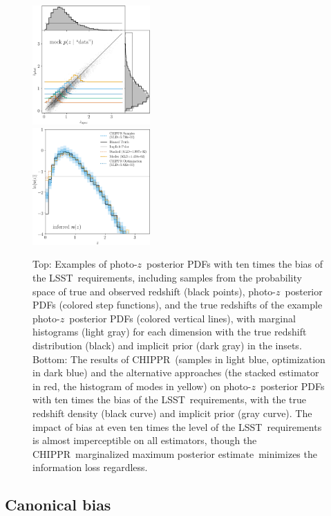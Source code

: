 \documentclass[iop]{emulateapj}
\newcommand{\project}[1]{\textsc{#1}}
\newcommand{\lsst}{\project{LSST}}
\newcommand{\Chippr}{\project{CHIPPR}}
\newcommand{\pz}{photo-$z$}
\newcommand{\pzpdf}{\pz\ posterior PDF}
\newcommand{\mmle}{marginalized maximum posterior estimate}
\begin{document}
\begin{figure}
	\begin{center}
		\includegraphics[width=0.4\textwidth]{data_bias.png}\\
		\includegraphics[width=0.4\textwidth]{results_bias.png}
		\caption{
			Top: Examples of \pzpdf s with ten times the bias of the \lsst\ requirements, including samples from the probability space of true and observed redshift (black points), \pzpdf s (colored step functions), and the true redshifts of the example \pzpdf s (colored vertical lines), with marginal histograms (light gray) for each dimension with the true redshift distribution (black) and implicit prior (dark gray) in the insets.
			Bottom: The results of \Chippr\ (samples in light blue, optimization in dark blue) and the alternative approaches (the stacked estimator in red, the histogram of modes in yellow) on \pzpdf s with ten times the bias of the \lsst\ requirements, with the true redshift density (black curve) and implicit prior (gray curve).
			The impact of bias at even ten times the level of the \lsst\ requirements is almost imperceptible on all estimators, though the \Chippr\ \mmle\ minimizes the information loss regardless.
		}
		\label{fig:bias}
	\end{center}
\end{figure}

\subsection{Canonical bias}
\label{sec:bias}
\end{document}
